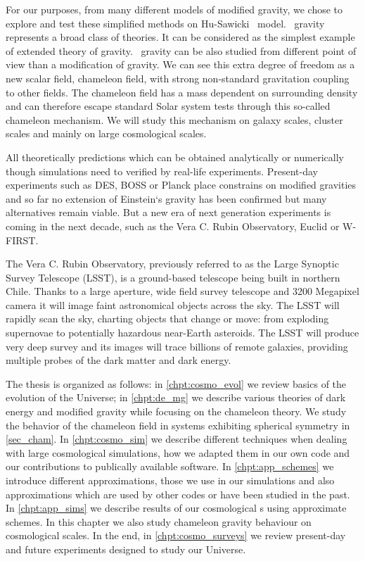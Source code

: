 For our purposes, from many different models of modified gravity, we chose to explore and test these simplified methods on Hu-Sawicki \fR\ model. \fR\ gravity represents a broad class of theories. It can be considered as the simplest example of extended theory of gravity. \fR\ gravity can be also studied from different point of view than a modification of gravity. We can see this extra degree of freedom as a new scalar field, chameleon field, with strong non-standard gravitation coupling to other fields. The chameleon field has a mass dependent on surrounding density and can therefore escape standard Solar system tests through this so-called chameleon mechanism. We will study this mechanism on galaxy scales, cluster scales and mainly on large cosmological scales.

All theoretically predictions which can be obtained analytically or numerically though simulations need to verified by real-life experiments. Present-day experiments such as DES, BOSS or Planck place constrains on modified gravities and so far no extension of Einstein`s gravity has been confirmed but many alternatives remain viable. But a new era of next generation experiments is coming in the next decade, such as the Vera C. Rubin Observatory, Euclid or W-FIRST.

The Vera C. Rubin Observatory, previously referred to as the Large Synoptic Survey Telescope (LSST), is a ground-based telescope being built in northern Chile. Thanks to a large aperture, wide field survey telescope and 3200 Megapixel camera it will image faint astronomical objects across the sky. The LSST will rapidly scan the sky, charting objects that change or move: from exploding supernovae to potentially hazardous near-Earth asteroids. The LSST will produce very deep survey and its images will trace billions of remote galaxies, providing multiple probes of the dark matter and dark energy.

The thesis is organized as follows: in \autoref{chpt:cosmo_evol} we review basics of the evolution of the Universe; in \autoref{chpt:de_mg} we describe various theories of dark energy and modified gravity while focusing on the chameleon theory. We study the behavior of the chameleon field in systems exhibiting spherical symmetry in \autoref{sec_cham}. In \autoref{chpt:cosmo_sim} we describe different techniques when dealing with large cosmological simulations, how we adapted them in our own code and our contributions to publically available software. In \autoref{chpt:app_schemes} we introduce different approximations, those we use in our simulations and also approximations which are used by other codes or have been studied in the past. In \autoref{chpt:app_sims} we describe results of our cosmological \nbodysim s using approximate schemes. In this chapter we also study chameleon gravity behaviour on cosmological scales. In the end, in \autoref{chpt:cosmo_surveys} we review present-day and future experiments designed to study our Universe.

